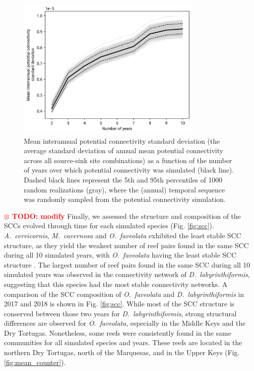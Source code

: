 \documentclass[preprint,12pt,authoryear]{elsarticle}
\newcommand{\todo}[1]{\textbf{\textcolor{red}{$\otimes$ TODO: #1}}}
\begin{document}
	\begin{figure}
		\centering
		\includegraphics[width=0.8\textwidth]{figures/fig_cm_std.png}
		\caption{Mean interannual potential connectivity standard deviation (the average standard deviation of annual mean potential connectivity across all source-sink site combinations) as a function of the number of years over which potential connectivity was simulated (black line). Dashed black lines represent the 5th and 95th percentiles of 1000 random realizations (gray), where the (annual) temporal sequence was randomly sampled from the potential connectivity simulation.}\label{fig:saturation}
	\end{figure}
	
	\todo{modify} Finally, we assessed the structure and composition of the SCCs evolved through time for each simulated species (Fig. \ref{fig:scc}). \textit{A.~cervicornis}, \textit{M.~cavernosa} and \textit{O.~faveolata} exhibited the least stable SCC structure, as they yield the weakest number of reef pairs found in the same SCC during all 10 simulated years, with \textit{O.~faveolata} having the least stable SCC structure . The largest number of reef pairs found in the same SCC during all 10 simulated years was observed in the connectivity network of \textit{D.~labyrinthiformis}, suggesting that this species had the most stable connectivity networks. A comparison of the SCC composition of \textit{O.~faveolata} and \textit{D.~labyrinthiformis} in 2017 and 2018 is shown in Fig. \ref{fig:scc}. While most of the SCC structure is conserved between those two years for \textit{D.~labyrinthiformis}, strong structural differences are observed for \textit{O.~faveolata}, especially in the Middle Keys and the Dry Tortugas. Nonetheless, some reefs were consistently found in the same communities for all simulated species and years. These reefs are located in the northern Dry Tortugas, north of the Marquesas, and in the Upper Keys (Fig. \ref{fig:mean_counter}).
	
\end{document}
